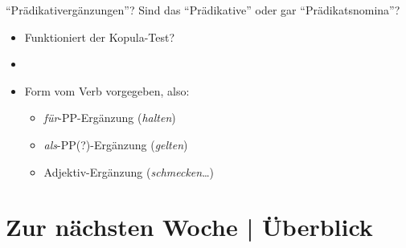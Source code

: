 \begin{frame}
  {"`Prädikativergänzungen"'?}
  \pause
  Sind das "`Prädikative"' oder gar "`Prädikatsnomina"'?\\
  \Halbzeile
  \pause
  \begin{exe}
    \ex\label{ex:praedikative032}
    \begin{xlist}
    \end{xlist}
  \end{exe}
  \pause
  \begin{itemize}[<+->]
    \item Funktioniert der Kopula-Test?
    \item {}
    \item \alert{Form vom Verb vorgegeben}, also:
      \begin{itemize}[<+->]
        \item \textit{für}-PP-Ergänzung (\textit{halten})
        \item \textit{als}-PP(?)-Ergänzung (\textit{gelten})
        \item Adjektiv-Ergänzung (\textit{schmecken}\ldots)\\
      \end{itemize}
  \end{itemize}
\end{frame}

\section{Zur nächsten Woche | Überblick}

